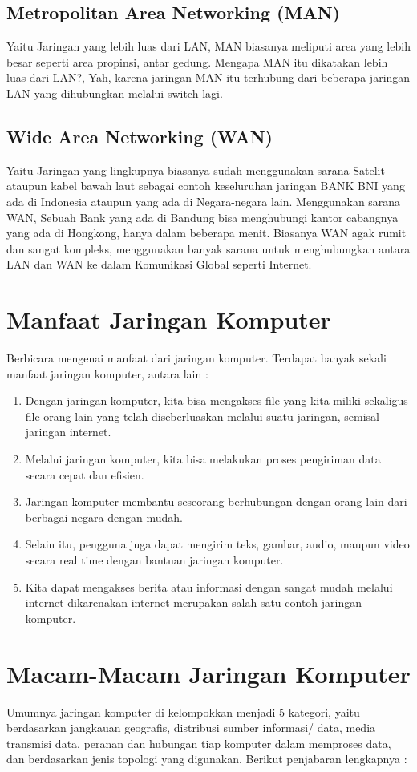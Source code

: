   \subsection{Metropolitan Area Networking (MAN)}
    Yaitu Jaringan yang lebih luas dari LAN, MAN biasanya meliputi area yang lebih besar seperti area propinsi, antar gedung. Mengapa MAN itu dikatakan lebih luas dari LAN?, Yah, karena jaringan MAN itu terhubung dari beberapa jaringan LAN yang dihubungkan melalui switch lagi.
  \subsection{Wide Area Networking (WAN)}
    Yaitu Jaringan yang lingkupnya biasanya sudah menggunakan sarana Satelit ataupun kabel bawah laut sebagai contoh keseluruhan jaringan BANK BNI yang ada di Indonesia ataupun yang ada di Negara-negara lain. Menggunakan sarana WAN, Sebuah Bank yang ada di Bandung bisa menghubungi kantor cabangnya yang ada di Hongkong, hanya dalam beberapa menit. Biasanya WAN agak rumit dan sangat kompleks, menggunakan banyak sarana untuk menghubungkan antara LAN dan WAN ke dalam Komunikasi Global seperti Internet.
\section{Manfaat Jaringan Komputer}
  Berbicara mengenai manfaat dari jaringan komputer. Terdapat banyak sekali manfaat jaringan komputer, antara lain :
    \begin{enumerate}
      \item Dengan jaringan komputer, kita bisa mengakses file yang kita miliki sekaligus file orang lain yang telah diseberluaskan melalui suatu jaringan, semisal jaringan internet.
      \item Melalui jaringan komputer, kita bisa melakukan proses pengiriman data secara cepat dan efisien.
      \item Jaringan komputer membantu seseorang berhubungan dengan orang lain dari berbagai negara dengan mudah.
      \item Selain itu, pengguna juga dapat mengirim teks, gambar, audio, maupun video secara real time dengan bantuan jaringan komputer.
      \item Kita dapat mengakses berita atau informasi dengan sangat mudah melalui internet dikarenakan internet merupakan salah satu contoh jaringan komputer.
    \end{enumerate}
\section{Macam-Macam Jaringan Komputer}
  Umumnya jaringan komputer di kelompokkan menjadi 5 kategori, yaitu berdasarkan jangkauan geografis, distribusi sumber informasi/ data, media transmisi data, peranan dan hubungan tiap komputer dalam memproses data, dan berdasarkan jenis topologi yang digunakan. Berikut penjabaran lengkapnya :
